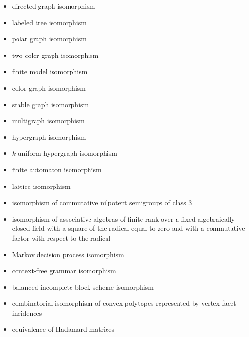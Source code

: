\documentclass{amsart}
\theoremstyle{definition} \newtheorem{definition}[definition]{Definition}
\begin{document}
\begin{itemize}
\item directed graph isomorphism \cite{miller79}
\item labeled tree isomorphism \cite{babai79}
\item polar graph isomorphism \cite{zkt85}
\item two-color graph isomorphism \cite{zkt85}
\item finite model isomorphism \cite{miller79} %
\item color graph isomorphism \cite{zkt85, miller77, pultr64}
\item stable graph isomorphism \cite{wl68}
\item multigraph isomorphism \cite{zkt85} 
\item hypergraph isomorphism \cite{zkt85} 
\item $k$-uniform hypergraph isomorphism \cite{zkt85, hn70}
\item finite automaton isomorphism \cite{booth78}
\item lattice isomorphism \cite{frucht50}
\item isomorphism of commutative nilpotent semigroups of class 3 
\item isomorphism of associative algebras of finite rank over a fixed
  algebraically closed field with a square of the radical equal to zero and
  with a commutative factor with respect to the radical \cite{grigoriev83}
\item Markov decision process isomorphism \cite{nr08}
\item context-free grammar isomorphism
\item balanced incomplete block-scheme isomorphism \cite{cc81}
\item combinatorial isomorphism of convex polytopes represented by
  vertex-facet incidences \cite{ks03}
\item equivalence of Hadamard matrices \cite{mckay79}
\end{itemize}
\end{document}
